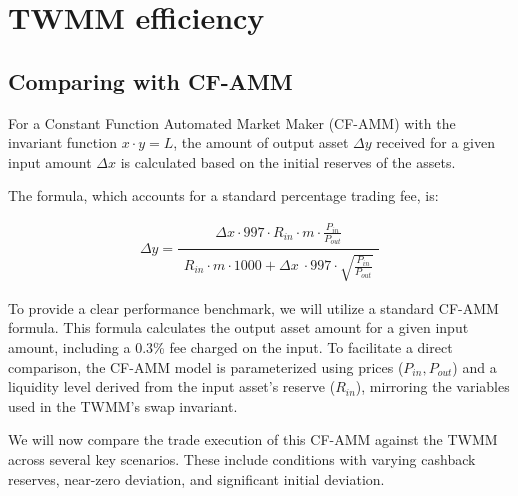 \section{TWMM efficiency}
\subsection{Comparing with CF-AMM}
For a Constant Function Automated Market Maker (CF-AMM) with the invariant function $x \cdot y = L$, the amount of output asset $\Delta y$ received for a given input amount $\Delta x$ is calculated based on the initial reserves of the assets.

The formula, which accounts for a standard percentage trading fee, is:

\begin{equation}
	\label{eq:cfamm_price_function}
	\Delta y=\frac{ 
		\begin{aligned} 
			\Delta x\cdot997\cdot R_{in}\cdot m \cdot\frac{P_{in}}{P_{out}} 
		\end{aligned}
	}{
		\begin{aligned} 
			R_{in}\cdot m \cdot1000+ \Delta x\ \cdot997\cdot\sqrt{\frac{P_{in}}{P_{out}}}
		\end{aligned}
	}
\end{equation}

To provide a clear performance benchmark, we will utilize a standard CF-AMM formula. This formula calculates the output asset amount for a given input amount, including a 0.3\% fee charged on the input. To facilitate a direct comparison, the CF-AMM model is parameterized using prices ($P_{in}, P_{out}$) and a liquidity level derived from the input asset's reserve ($R_{in}$), mirroring the variables used in the TWMM's swap invariant.

We will now compare the trade execution of this CF-AMM against the TWMM across several key scenarios. These include conditions with varying cashback reserves, near-zero deviation, and significant initial deviation.

